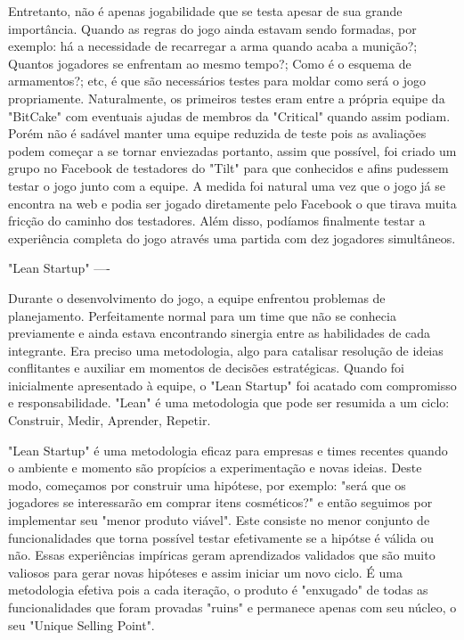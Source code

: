 Entretanto, não é apenas jogabilidade que se testa apesar de sua grande importância. Quando as regras do jogo ainda estavam sendo formadas, por exemplo: há a necessidade de recarregar a arma quando acaba a munição?; Quantos jogadores se enfrentam ao mesmo tempo?; Como é o esquema de armamentos?; etc, é que são necessários testes para moldar como será o jogo propriamente. Naturalmente, os primeiros testes eram entre a própria equipe da "BitCake" com eventuais ajudas de membros da "Critical" quando assim podiam. Porém não é sadável manter uma equipe reduzida de teste pois as avaliações podem começar a se tornar enviezadas portanto, assim que possível, foi criado um grupo no Facebook de testadores do "Tilt" para que conhecidos e afins pudessem testar o jogo junto com a equipe. A medida foi natural uma vez que o jogo já se encontra na web e podia ser jogado diretamente pelo Facebook o que tirava muita fricção do caminho dos testadores. Além disso, podíamos finalmente testar a experiência completa do jogo através uma partida com dez jogadores simultâneos.


"Lean Startup"
----

Durante o desenvolvimento do jogo, a equipe enfrentou problemas de planejamento. Perfeitamente normal para um time que não se conhecia previamente e ainda estava encontrando sinergia entre as habilidades de cada integrante. Era preciso uma metodologia, algo para catalisar resolução de ideias conflitantes e auxiliar em momentos de decisões estratégicas. Quando foi inicialmente apresentado à equipe, o "Lean Startup" foi acatado com compromisso e responsabilidade. "Lean" é uma metodologia que pode ser resumida a um ciclo: Construir, Medir, Aprender, Repetir.

"Lean Startup" é uma metodologia eficaz para empresas e times recentes quando o ambiente e momento são propícios a experimentação e novas ideias. Deste modo, começamos por construir uma hipótese, por exemplo: "será que os jogadores se interessarão em comprar itens cosméticos?" e então seguimos por implementar seu "menor produto viável". Este consiste no menor conjunto de funcionalidades que torna possível testar efetivamente se a hipótse é válida ou não. Essas experiências impíricas geram aprendizados validados que são muito valiosos para gerar novas hipóteses e assim iniciar um novo ciclo. É uma metodologia efetiva pois a cada iteração, o produto é "enxugado" de todas as funcionalidades que foram provadas "ruins" e permanece apenas com seu núcleo, o seu "Unique Selling Point".


